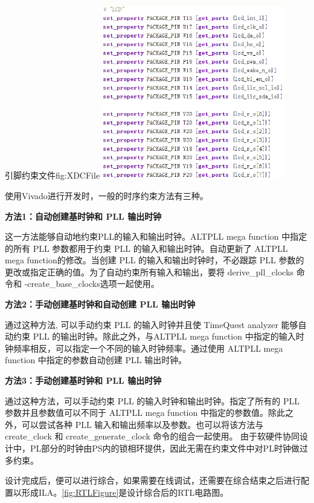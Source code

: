 \documentclass[supercite]{HustGraduPaper}
\begin{document}
	\begin{generalfig}[htb]{引脚约束文件}{fig:XDCFile}
		\includegraphics[width=8cm]{Figures/XDCFile.png}
	\end{generalfig}
	

	使用Vivado进行开发时，一般的时序约束方法有三种。
	
	{\songti \bfseries 方法1：自动创建基时钟和 PLL 输出时钟}
	
	
	这一方法能够自动地约束PLL的输入和输出时钟。ALTPLL mega function 中指定的所有 PLL 参数都用于约束 PLL 的输入和输出时钟。自动更新了 ALTPLL mega function的修改。当创建 PLL 的输入和输出时钟时，不必跟踪 PLL 参数的更改或指定正确的值。为了自动约束所有输入和输出，要将 derive\_pll\_clocks 命令和 -create\_base\_clocks选项一起使用。
	
	{\songti \bfseries 方法2：手动创建基时钟和自动创建 PLL 输出时钟}
	
	
	通过这种方法, 可以手动约束 PLL 的输入时钟并且使 TimeQuest analyzer 能够自动约束 PLL 的输出时钟。除此之外，与ALTPLL mega function 中指定的输入时钟频率相反，可以指定一个不同的输入时钟频率。通过使用 ALTPLL mega function 中指定的参数自动创建 PLL 输出时钟。
	
	{\songti \bfseries 方法3：手动创建基时钟和 PLL 输出时钟}
	
	
	通过这种方法，可以手动约束 PLL 的输入时钟和输出时钟。指定了所有的 PLL 参数并且参数值可以不同于 ALTPLL mega function 中指定的参数值。除此之外，可以尝试各种 PLL 输入和输出频率以及参数。也可以将该方法与 create\_clock 和 create\_generate\_clock 命令的组合一起使用。
	由于软硬件协同设计中，PL部分的时钟由PS内的锁相环提供，因此无需在约束文件中对PL时钟做过多约束。
	
	
	
	设计完成后，便可以进行综合，如果需要在线调试，还需要在综合结束之后进行配置以形成ILA。\autoref{fig:RTLFigure}是设计综合后的RTL电路图。
	
\end{document}
